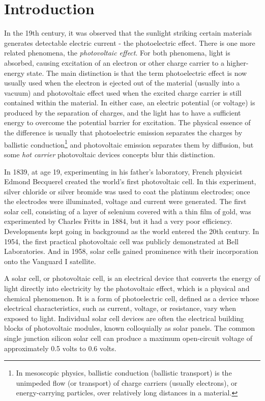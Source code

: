 \documentclass[%
 aip,
 amsmath,amssymb,
 reprint, floatfix%
]{revtex4-2}
\begin{document}
\section{Introduction}
    In the 19th century, it was observed that the sunlight striking certain materials generates detectable electric current - the photoelectric effect. There is one more related phenomena, the \textit{photovoltaic effect}. For both phenomena, light is absorbed, causing excitation of an electron or other charge carrier to a higher-energy state. The main distinction is that the term photoelectric effect is now usually used when the electron is ejected out of the material (usually into a vacuum) and photovoltaic effect used when the excited charge carrier is still contained within the material. In either case, an electric potential (or voltage) is produced by the separation of charges, and the light has to have a sufficient energy to overcome the potential barrier for excitation. The physical essence of the difference is usually that photoelectric emission separates the charges by ballistic conduction\footnote{In mesoscopic physics, ballistic conduction (ballistic transport) is the unimpeded flow (or transport) of charge carriers (usually electrons), or energy-carrying particles, over relatively long distances in a material.} and photovoltaic emission separates them by diffusion, but some \textit{hot carrier} photovoltaic devices concepts blur this distinction.
    \par
    In 1839, at age 19, experimenting in his father's laboratory, French physicist Edmond Becquerel created the world's first photovoltaic cell. In this experiment, silver chloride or silver bromide was used to coat the platinum electrodes; once the electrodes were illuminated, voltage and current were generated. The first solar cell, consisting of a layer of selenium covered with a thin film of gold, was experimented by Charles Fritts in 1884, but it had a very poor efficiency. Developments kept going in background as the world entered the 20th century. In 1954, the first practical photovoltaic cell was publicly demonstrated at Bell Laboratories. And in 1958, solar cells gained prominence with their incorporation onto the Vanguard I satellite.
    \par
    A solar cell, or photovoltaic cell, is an electrical device that converts the energy of light directly into electricity by the photovoltaic effect, which is a physical and chemical phenomenon. It is a form of photoelectric cell, defined as a device whose electrical characteristics, such as current, voltage, or resistance, vary when exposed to light. Individual solar cell devices are often the electrical building blocks of photovoltaic modules, known colloquially as solar panels. The common single junction silicon solar cell can produce a maximum open-circuit voltage of approximately 0.5 volts to 0.6 volts.
\end{document}
